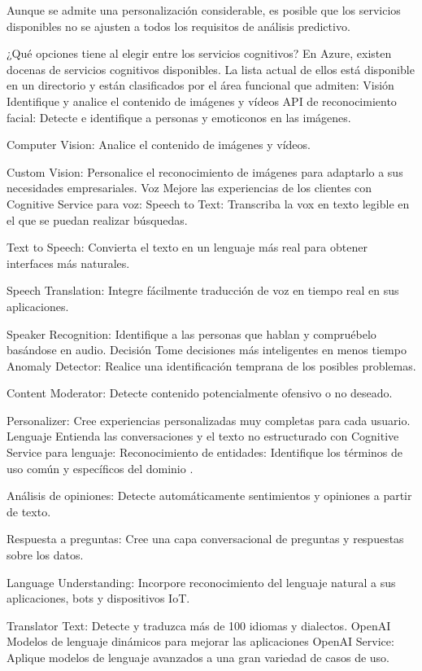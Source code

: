Aunque se admite una personalización considerable, es posible que los servicios disponibles no se ajusten a todos los requisitos de análisis predictivo.

¿Qué opciones tiene al elegir entre los servicios cognitivos?
En Azure, existen docenas de servicios cognitivos disponibles. La lista actual de ellos está disponible en un directorio y están clasificados por el área funcional que admiten:
Visión
Identifique y analice el contenido de imágenes y vídeos
API de reconocimiento facial: Detecte e identifique a personas y emoticonos en las imágenes.

Computer Vision: Analice el contenido de imágenes y vídeos.

Custom Vision: Personalice el reconocimiento de imágenes para adaptarlo a sus necesidades empresariales.
Voz 
Mejore las experiencias de los clientes con Cognitive Service para voz:
Speech to Text: Transcriba la vox en texto legible en el que se puedan realizar búsquedas.

Text to Speech: Convierta el texto en un lenguaje más real para obtener interfaces más naturales.

Speech Translation: Integre fácilmente traducción de voz en tiempo real en sus aplicaciones.

Speaker Recognition: Identifique a las personas que hablan y compruébelo basándose en audio.
Decisión
Tome decisiones más inteligentes en menos tiempo
Anomaly Detector: Realice una identificación temprana de los posibles problemas.

Content Moderator: Detecte contenido potencialmente ofensivo o no deseado.

Personalizer: Cree experiencias personalizadas muy completas para cada usuario.
Lenguaje
Entienda las conversaciones y el texto no estructurado con Cognitive Service para lenguaje:
Reconocimiento de entidades: Identifique los términos de uso común y específicos del dominio \cite{Molnar2019}.

Análisis de opiniones: Detecte automáticamente sentimientos y opiniones a partir de texto.

Respuesta a preguntas: Cree una capa conversacional de preguntas y respuestas sobre los datos.

Language Understanding: Incorpore reconocimiento del lenguaje natural a sus aplicaciones, bots y dispositivos IoT.

Translator Text: Detecte y traduzca más de 100 idiomas y dialectos.
OpenAI
Modelos de lenguaje dinámicos para mejorar las aplicaciones
OpenAI Service: Aplique modelos de lenguaje avanzados a una gran variedad de casos de uso.

